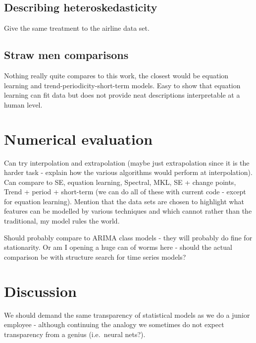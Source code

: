 \documentclass{article}
\def\ie{i.e.\ }
\def\eg{e.g.\ }
\begin{document}
\subsection{Describing heteroskedasticity}
\label{sec:airline}

Give the same treatment to the airline data set.

\subsection{Straw men comparisons}

Nothing really quite compares to this work, the closest would be equation learning and trend-periodicity-short-term models.
Easy to show that equation learning can fit data but does not provide neat descriptions interpretable at a human level.

\section{Numerical evaluation}

Can try interpolation and extrapolation (maybe just extrapolation since it is the harder task - explain how the various algorithms would perform at interpolation).
Can compare to SE, equation learning, Spectral, MKL, SE + change points, Trend + period + short-term (we can do all of these with current code - except for equation learning).
Mention that the data sets are chosen to highlight what features can be modelled by various techniques and which cannot rather than the traditional, my model rules the world.

Should probably compare to ARIMA class models - they will probably do fine for stationarity.
Or am I opening a huge can of worms here - should the actual comparison be with structure search for time series models?



\section{Discussion}

We should demand the same transparency of statistical models as we do a junior employee - although continuing the analogy we sometimes do not expect transparency from a genius (\ie neural nets?).
\end{document}
